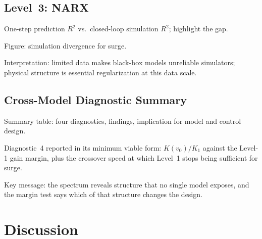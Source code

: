 \documentclass[11pt]{article}
\begin{document}
\subsection{Level~3: NARX}
\begin{outline}
\item One-step prediction $R^2$ vs.\ closed-loop simulation $R^2$; highlight the gap.
\item Figure: simulation divergence for surge.
\item Interpretation: limited data makes black-box models unreliable simulators;
  physical structure is essential regularization at this data scale.
\end{outline}

\subsection{Cross-Model Diagnostic Summary}
\begin{outline}
\item Summary table: four diagnostics, findings, implication for model and control
  design.
\item Diagnostic~4 reported in its minimum viable form: $K(v_0)/K_1$ against the
  Level-1 gain margin, plus the crossover speed at which Level~1 stops being
  sufficient for surge.
\item Key message: the spectrum reveals structure that no single model exposes, and
  the margin test says which of that structure changes the design.
\end{outline}

\section{Discussion}
\label{sec:discussion}
\end{document}
